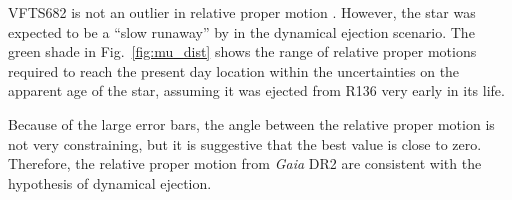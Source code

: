 \documentclass[apjl,twocolumn]{emulateapj}
\DeclareRobustCommand{\Figref}[1]{Fig.~\ref{#1}}
\begin{document}
VFTS682 is not an outlier in relative proper motion%
. However, the star was expected to be a ``slow runaway'' by \citet{bestenlehner:11} in
the dynamical ejection scenario. The green shade in
\Figref{fig:mu_dist} shows the range of relative proper motions
required to reach the present day location within
the uncertainties on the apparent age of the star, assuming it was
ejected from R136 very early in its life.

Because of the large
error bars, the angle between the relative proper motion is not very
constraining, but it is suggestive that the best value is close to zero.
Therefore, the relative proper motion from \emph{Gaia} DR2 are consistent with the hypothesis
of dynamical ejection.
\end{document}
